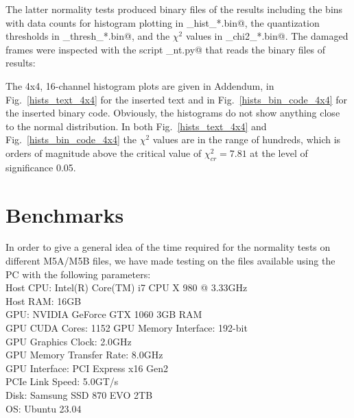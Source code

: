 \documentclass[letterpaper,twoside,12pt]{article}
\begin{document}
The latter normality tests produced binary files of the results including the bins with data counts for histogram plotting in \verb@nt_hist_*.bin@, the quantization thresholds in \verb@nt_thresh_*.bin@, and the $\chi^2$ values in \verb@nt_chi2_*.bin@. The damaged frames were inspected with the script \verb@inspect_nt.py@ that reads the binary files of results: \\

\noindent \verb@%run inspect_nt.py rd1910_wz_268-1811_bin_code.m5b 067  2000 1@ \\
\noindent \verb@%run inspect_nt.py rd1910_wz_268-1811_text.m5b 056  5006 1@. \\


The 4x4, 16-channel histogram plots are given in Addendum, in Fig.~\ref{hists_text_4x4} for the inserted text and in Fig.~\ref{hists_bin_code_4x4} for the inserted binary code. Obviously, the histograms do not show anything close to the normal distribution. In both Fig.~\ref{hists_text_4x4} and Fig.~\ref{hists_bin_code_4x4} the $\chi^2$ values are in the range of hundreds, which is orders of magnitude above the critical value of $\chi^2_{cr} = 7.81$ at the level of significance 0.05. 



\section{Benchmarks}

In order to give a general idea of the time required for the normality tests on different M5A/M5B files, we have made testing on the files available using the PC with the following parameters: \\

\indent Host CPU: Intel(R) Core(TM) i7 CPU X 980 @ 3.33GHz \\
\indent Host RAM: 16GB \\
\indent GPU: NVIDIA GeForce GTX 1060 3GB RAM \\
\indent GPU CUDA Cores: 1152
\indent GPU Memory Interface: 192-bit \\
\indent GPU Graphics Clock: 2.0GHz \\
\indent GPU Memory Transfer Rate: 8.0GHz \\
\indent GPU Interface: PCI Express x16 Gen2 \\
\indent PCIe Link Speed: 5.0GT/s \\
\indent Disk: Samsung SSD 870 EVO 2TB \\
\indent OS: Ubuntu 23.04 \\
\end{document}
